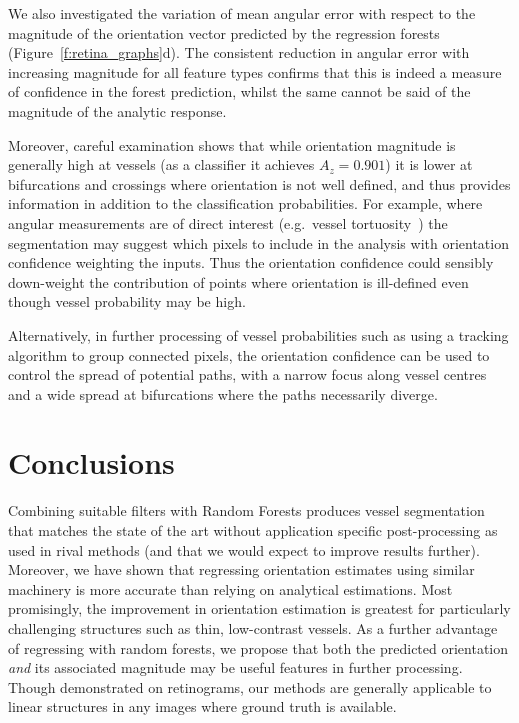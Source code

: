 \documentclass[runningheads,a4paper]{llncs}
\newcommand{\fref}[1]{Figure~\ref{#1}}
\def\eg{e.g.}
\begin{document}
We also investigated the variation of mean angular error with respect to the magnitude of the orientation vector predicted by the regression forests (\fref{f:retina_graphs}d). The consistent reduction in angular error with increasing magnitude for all feature types confirms that this is indeed a measure of confidence in the forest prediction, whilst the same cannot be said of the magnitude of the analytic response.

Moreover, careful examination shows that while orientation magnitude is generally high at vessels (as a classifier it achieves $A_z = 0.901$) it is lower at bifurcations and crossings where orientation is not well defined, and thus provides information in addition to the classification probabilities. For example, where angular measurements are of direct interest (\eg~vessel tortuosity~\cite{Hart_etal_IJMI99}) the segmentation may suggest which pixels to include in the analysis with orientation confidence weighting the inputs. Thus the orientation confidence could sensibly down-weight the contribution of points where orientation is ill-defined even though vessel probability may be high.

Alternatively, in further processing of vessel probabilities such as using a tracking algorithm to group connected pixels, the orientation confidence can be used to control the spread of potential paths, with a narrow focus along vessel centres and a wide spread at bifurcations where the paths necessarily diverge.


\section{Conclusions}
\label{s:conclusions}
Combining suitable filters with Random Forests produces vessel segmentation that matches the state of the art without application specific post-processing as used in rival methods (and that we would expect to improve results further). Moreover, we have shown that regressing orientation estimates using similar machinery is more accurate than relying on analytical estimations. Most promisingly, the improvement in orientation estimation is greatest for particularly challenging structures such as thin, low-contrast vessels. As a further advantage of regressing with random forests, we propose that both the predicted orientation \emph{and} its associated magnitude may be useful features in further processing. Though demonstrated on retinograms, our methods are generally applicable to linear structures in any images where ground truth is available.




\end{document}
